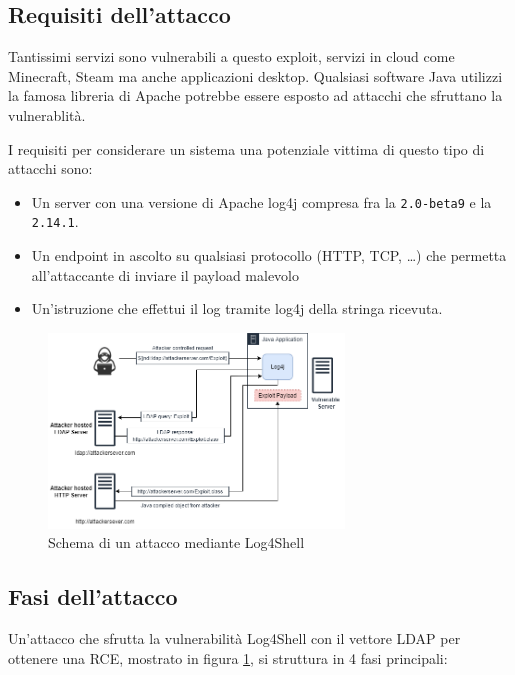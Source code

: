 \documentclass[a4paper, 12pt]{article}
\begin{document}
\subsection{Requisiti dell'attacco}
Tantissimi servizi sono vulnerabili a questo exploit, servizi in cloud come Minecraft, Steam ma anche applicazioni desktop.
Qualsiasi software Java utilizzi la famosa libreria di Apache potrebbe essere esposto ad attacchi che sfruttano la vulnerablità.

I requisiti per considerare un sistema una potenziale vittima di questo tipo di attacchi sono:
\begin{itemize}
    \item Un server con una versione di Apache log4j compresa fra la \verb!2.0-beta9! e la \verb!2.14.1!.
    
    \item Un endpoint in ascolto su qualsiasi protocollo (HTTP, TCP, \dots) che permetta all'attaccante di inviare il payload malevolo
    
    \item Un'istruzione che effettui il log tramite log4j della stringa ricevuta.
\end{itemize}

\begin{figure}
\centering
\includegraphics[width=0.7\textwidth]{img/log4shell.png}
\caption{Schema di un attacco mediante Log4Shell}
\label{fig:log4shellschema}
\end{figure}


\subsection{Fasi dell'attacco}
Un'attacco che sfrutta la vulnerabilità Log4Shell con il vettore LDAP per ottenere una RCE, mostrato in figura \ref{fig:log4shellschema}, si struttura in 4 fasi principali:
\end{document}
